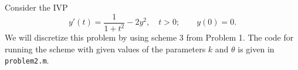 \documentclass{homework}
\begin{document}
	\question
	
	Consider the IVP
	\begin{equation}
		y'(t) = \frac{1}{1+t^2} - 2y^2, \quad t >0; \qquad y(0) = 0.
	\end{equation}
	We will discretize this problem by using scheme 3 from Problem 1. The code for running the scheme with given values of the parameters $k$ and $\theta$ is given in \lstinline{problem2.m}.
	
	
\end{document}
